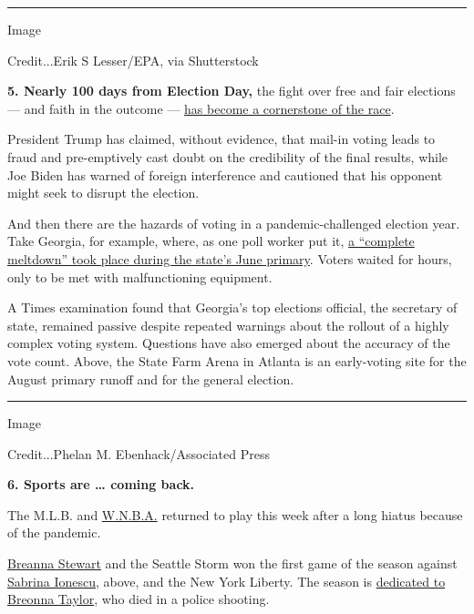 \begin{center}\rule{0.5\linewidth}{\linethickness}\end{center}

Image

Credit...Erik S Lesser/EPA, via Shutterstock

\textbf{5. Nearly 100 days from Election Day,} the fight over free and
fair elections --- and faith in the outcome ---
\href{https://www.nytimes3xbfgragh.onion/2020/07/25/us/politics/2020-election-voter-fraud-interference.html}{has
become a cornerstone of the race}.

President Trump has claimed, without evidence, that mail-in voting leads
to fraud and pre-emptively cast doubt on the credibility of the final
results, while Joe Biden has warned of foreign interference and
cautioned that his opponent might seek to disrupt the election.

And then there are the hazards of voting in a pandemic-challenged
election year. Take Georgia, for example, where, as one poll worker put
it,
\href{https://www.nytimes3xbfgragh.onion/2020/07/25/us/politics/georgia-election-voting-problems.html}{a
``complete meltdown'' took place during the state's June primary}.
Voters waited for hours, only to be met with malfunctioning equipment.

A Times examination found that Georgia's top elections official, the
secretary of state, remained passive despite repeated warnings about the
rollout of a highly complex voting system. Questions have also emerged
about the accuracy of the vote count. Above, the State Farm Arena in
Atlanta is an early-voting site for the August primary runoff and for
the general election.

\begin{center}\rule{0.5\linewidth}{\linethickness}\end{center}

Image

Credit...Phelan M. Ebenhack/Associated Press

\textbf{6. Sports are \ldots{} coming back.}

The M.L.B. and
\href{https://www.nytimes3xbfgragh.onion/2020/07/23/sports/basketball/wnba-season-preview.html}{W.N.B.A.}
returned to play this week after a long hiatus because of the pandemic.

\href{https://www.nytimes3xbfgragh.onion/2020/07/25/sports/basketball/breanna-stewart-seattle-storm-wnba.html}{Breanna
Stewart} and the Seattle Storm won the first game of the season against
\href{https://www.nytimes3xbfgragh.onion/2020/07/24/sports/basketball/wnba-eastern-conference-preview.html}{Sabrina
Ionescu}, above, and the New York Liberty. The season is
\href{https://www.nytimes3xbfgragh.onion/2020/07/25/sports/wnba-seattle-storm-new-york-liberty.html}{dedicated
to Breonna Taylor}, who died in a police shooting.

